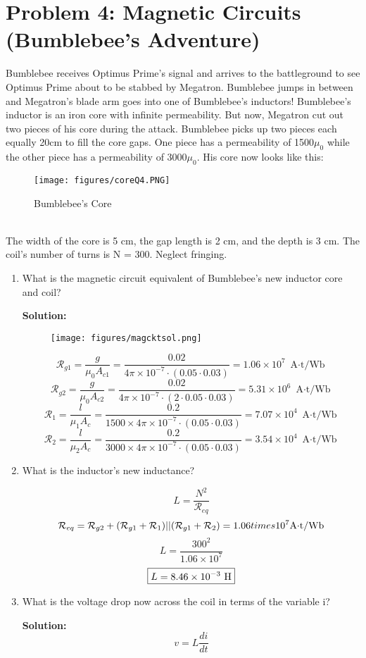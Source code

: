 \documentclass{article}
\begin{document}
\section*{Problem 4: Magnetic Circuits (Bumblebee's Adventure)}
Bumblebee receives Optimus Prime's signal and arrives to the battleground to see Optimus Prime about to be stabbed by Megatron. Bumblebee jumps in between and Megatron's blade arm goes into one of Bumblebee's inductors! Bumblebee's inductor is an iron core with infinite permeability. But now, Megatron cut out two pieces of his core during the attack. Bumblebee picks up two pieces each equally 20cm to fill the core gaps. One piece has a permeability of 1500$\mu_0$ while the other piece has a permeability of 3000$\mu_0$. His core now looks like this:
\begin{figure}[!htb]
        \centering
        \texttt{[image: figures/coreQ4.PNG]}
        \caption{Bumblebee's Core}
        \label{poletradsaj}
\end{figure} \\ The width of the core is 5 cm, the gap length is 2 cm, and the depth is 3 cm. The coil's number of turns is N = 300. Neglect fringing.
\begin{enumerate}[label=(\alph*)]
    \item {What is the magnetic circuit equivalent of Bumblebee's new inductor core and coil?}

\textbf{Solution:} 

\begin{figure}[!htb]
    \centering
    \texttt{[image: figures/magcktsol.png]}
\end{figure}
$$\mathcal{R}_{g1} = \frac{g}{\mu_0 A_{c1}} = \frac{0.02}{4\pi \times 10^{-7}\cdot (0.05 \cdot 0.03)} = 1.06\times 10^7\text{ A$\cdot$t/Wb}$$
$$\mathcal{R}_{g2} = \frac{g}{\mu_0 A_{c2}} = \frac{0.02}{4\pi \times 10^{-7}\cdot (2\cdot 0.05 \cdot 0.03)} = 5.31\times 10^6\text{ A$\cdot$t/Wb}$$
$$\mathcal{R}_{1} = \frac{l}{\mu_1 A_{c}} = \frac{0.2}{1500 \times 4\pi \times 10^{-7}\cdot (0.05 \cdot 0.03)} = 7.07\times 10^4\text{ A$\cdot$t/Wb}$$
$$\mathcal{R}_{2} = \frac{l}{\mu_2 A_{c}} = \frac{0.2}{3000 \times 4\pi \times 10^{-7}\cdot (0.05 \cdot 0.03)} = 3.54\times 10^4\text{ A$\cdot$t/Wb}$$

    \item {What is the inductor's new inductance?}

$$L = \frac{N^2}{\mathcal{R}_{eq}}$$
$$\mathcal{R}_{eq} = \mathcal{R}_{g2} + (\mathcal{R}_{g1} + \mathcal{R}_1)||(\mathcal{R}_{g1} + \mathcal{R}_2) = 1.06\\times 10^7 \text{A$\cdot$t/Wb}$$
$$L = \frac{300^2}{1.06\times 10^7}$$
$$\boxed{L = 8.46\times 10^{-3} \ \rm H}$$
    \item {What is the voltage drop now across the coil in terms of the variable i?}

\textbf{Solution:}
$$\boxed{v = L\frac{di}{dt}}$$
\end{enumerate}
\newpage %
\noindent 
\end{document}
